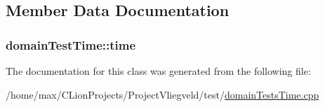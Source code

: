 \subsection{Member Data Documentation}
\subsubsection[{\texorpdfstring{time}{time}}]{ domain\+Test\+Time\+::time\hspace{0.3cm}{\ttfamily [protected]}}\hypertarget{classdomainTestTime_a9eee3a6a359895396c122cc18ded5d36}{}\label{classdomainTestTime_a9eee3a6a359895396c122cc18ded5d36}


The documentation for this class was generated from the following file\+:\begin{DoxyCompactItemize}
\item 
/home/max/\+C\+Lion\+Projects/\+Project\+Vliegveld/test/\hyperlink{domainTestsTime_8cpp}{domain\+Tests\+Time.\+cpp}\end{DoxyCompactItemize}
